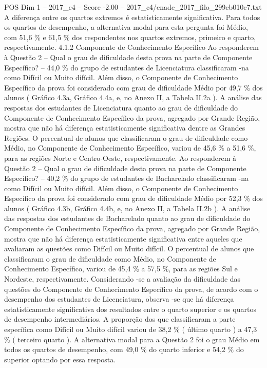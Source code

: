 \begin{textsample}{POS Dim 1 – 2017\_c4 – Score -2.00 – 2017\_c4/enade\_2017\_filo\_299cb010c7.txt}
A diferença entre os quartos extremos é estatisticamente significativa.
Para todos os quartos de desempenho, a alternativa modal para esta pergunta foi Médio, com 51,6 \% e 61,5 \% dos respondentes nos quartos extremos, primeiro e quarto, respectivamente. 4.1.2 Componente de Conhecimento Específico Ao responderem à Questão 2 – Qual o grau de dificuldade desta prova na parte de Componente Específico? – 44,0 \% do grupo de estudantes de Licenciatura classificaram -na como Difícil ou Muito difícil.
Além disso, o Componente de Conhecimento Específico da prova foi considerado com grau de dificuldade Médio por 49,7 \% dos alunos ( Gráfico 4.3a, Gráfico 4.4a, e, no Anexo II, a Tabela II.2a ).
A análise das respostas dos estudantes de Licenciatura quanto ao grau de dificuldade do Componente de Conhecimento Específico da prova, agregado por Grande Região, mostra que não há diferença estatisticamente significativa dentre as Grandes Regiões.
O percentual de alunos que classificaram o grau de dificuldade como Médio, no Componente de Conhecimento Específico, variou de 45,6 \% a 51,6 \%, para as regiões Norte e Centro-Oeste, respectivamente.
Ao responderem à Questão 2 – Qual o grau de dificuldade desta prova na parte de Componente Específico? – 40,2 \% do grupo de estudantes de Bacharelado classificaram -na como Difícil ou Muito difícil.
Além disso, o Componente de Conhecimento Específico da prova foi considerado com grau de dificuldade Médio por 52,3 \% dos alunos ( Gráfico 4.3b, Gráfico 4.4b, e, no Anexo II, a Tabela II.2b ).
A análise das respostas dos estudantes de Bacharelado quanto ao grau de dificuldade do Componente de Conhecimento Específico da prova, agregado por Grande Região, mostra que não há diferença estatisticamente significativa entre aqueles que avaliaram as questões como Difícil ou Muito difícil.
O percentual de alunos que classificaram o grau de dificuldade como Médio, no Componente de Conhecimento Específico, variou de 45,4 \% a 57,5 \%, para as regiões Sul e Nordeste, respectivamente.
Considerando -se a avaliação da dificuldade das questões do Componente de Conhecimento Específico da prova, de acordo com o desempenho dos estudantes de Licenciatura, observa -se que há diferença estatisticamente significativa dos resultados entre o quarto superior e os quartos de desempenho intermediários.
A proporção dos que classificaram a parte específica como Difícil ou Muito difícil variou de 38,2 \% ( último quarto ) a 47,3 \% ( terceiro quarto ).
A alternativa modal para a Questão 2 foi o grau Médio em todos os quartos de desempenho, com 49,0 \% do quarto inferior e 54,2 \% do superior optando por essa resposta.

\end{textsample}
